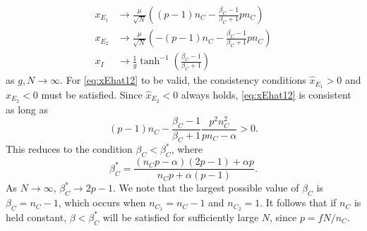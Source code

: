 \documentclass[reqno]{siamonline190516}
\begin{document}
\begin{equation}\label{eq:xEhat12IlargeN}
    \begin{aligned}
        x_{E_1} &\rightarrow\frac{\mu}{\sqrt{N}}\left( (p-1)n_C - \frac{\beta_C - 1}{\beta_C+1} p n_C \right) \\
        x_{E_2} &\rightarrow \frac{\mu}{\sqrt{N}}\left( -(p-1)n_C - \frac{\beta_C - 1}{\beta_C+1} p n_C \right) \\
        x_I &\rightarrow \frac{1}{g}\tanh^{-1}\left( \frac{\beta_C - 1}{\beta_C+1} \right)
    \end{aligned}
\end{equation}
as $g, N \rightarrow \infty$. For \cref{eq:xEhat12} to be valid, the consistency conditions $\hat{x}_{E_1} > 0$ and $\hat{x}_{E_2} < 0$ must be satisfied. Since $\hat{x}_{E_2} < 0$ always holds, \cref{eq:xEhat12} is consistent as long as
\[
(p-1)n_C - \frac{\beta_C - 1}{\beta_C+1}\frac{p^2 n_C^2}{p n_C - \alpha}  > 0.
\] 
This reduces to the condition $\beta_C < \beta_C^*$, where
\begin{equation}\label{eq:betaCstar}
    \beta_C^* = \frac{(n_C p - \alpha )(2 p - 1) + \alpha p}{n_C p + \alpha(p-1)}.
\end{equation}
As $N \rightarrow \infty$, $\beta_C^* \rightarrow 2 p-1$. We note that the largest possible value of $\beta_C$ is $\beta_C = n_C - 1$, which occurs when $n_{C_1} = n_C - 1$ and $n_{C_2} = 1$. It follows that if $n_C$ is held constant, $\beta < \beta_C^*$ will be satisfied for sufficiently large $N$, since $p = f N/n_C$.
\end{document}
